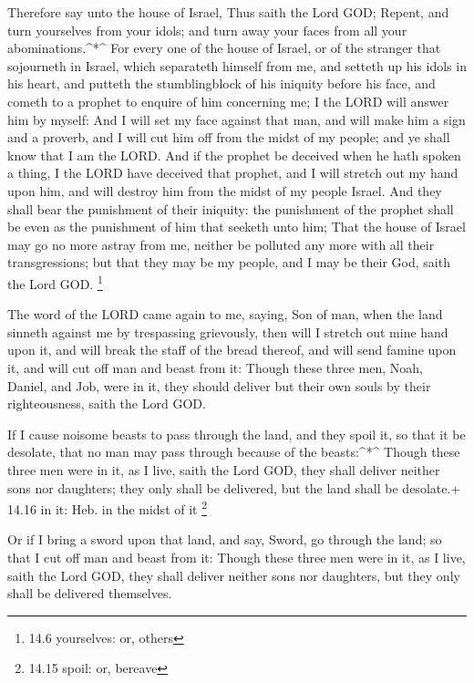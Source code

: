  Therefore say unto the house of Israel, Thus saith the Lord
GOD; Repent, and turn yourselves from your idols; and turn away your
faces from all your abominations.\^{}*\^{}  For every one of
the house of Israel, or of the stranger that sojourneth in Israel, which
separateth himself from me, and setteth up his idols in his heart, and
putteth the stumblingblock of his iniquity before his face, and cometh
to a prophet to enquire of him concerning me; I the LORD will answer him
by myself:  And I will set my face against that man, and
will make him a sign and a proverb, and I will cut him off from the
midst of my people; and ye shall know that I am the LORD. 
And if the prophet be deceived when he hath spoken a thing, I the LORD
have deceived that prophet, and I will stretch out my hand upon him, and
will destroy him from the midst of my people Israel.  And
they shall bear the punishment of their iniquity: the punishment of the
prophet shall be even as the punishment of him that seeketh unto him;
 That the house of Israel may go no more astray from me,
neither be polluted any more with all their transgressions; but that
they may be my people, and I may be their God, saith the Lord GOD.
\footnote{14.6 yourselves: or, others}

 The word of the LORD came again to me, saying,
 Son of man, when the land sinneth against me by
trespassing grievously, then will I stretch out mine hand upon it, and
will break the staff of the bread thereof, and will send famine upon it,
and will cut off man and beast from it:  Though these three
men, Noah, Daniel, and Job, were in it, they should deliver but their
own souls by their righteousness, saith the Lord GOD.

 If I cause noisome beasts to pass through the land, and
they spoil it, so that it be desolate, that no man may pass through
because of the beasts:\^{}*\^{}  Though these three men
were in it, as I live, saith the Lord GOD, they shall deliver neither
sons nor daughters; they only shall be delivered, but the land shall be
desolate.+ 14.16 in it: Heb. in the midst of it \footnote{14.15 spoil:
  or, bereave}

 Or if I bring a sword upon that land, and say, Sword, go
through the land; so that I cut off man and beast from it: 
Though these three men were in it, as I live, saith the Lord GOD, they
shall deliver neither sons nor daughters, but they only shall be
delivered themselves.

